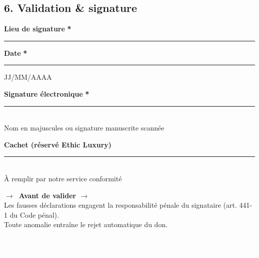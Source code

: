 \documentclass[12pt, a4paper]{article}
\newcommand{\arrow}{\textcolor{ethicGold}{\textbf{$\rightarrow$}}}
\newcommand{\required}{\textcolor{redalert}{\textbf{*}}}
\newcommand{\formfield}[2][]{%
    \par\noindent
    \begin{minipage}[t]{0.3\textwidth}
        \textbf{#2} \required
    \end{minipage}%
    \begin{minipage}[t]{0.68\textwidth}
        \rule{\linewidth}{0.4pt}%
        \ifblank{#1}{}{%
            \vspace{0.1cm}\newline
            {\tiny \textcolor{ethicGreenLight}{#1}}%
        }%
    \end{minipage}%
    \par\vspace{0.2cm}%
}
\begin{document}
\begin{sectionbox}
    \subsection*{6.  Validation \& signature}
    
    \vspace{0.3cm}
    \formfield{Lieu de signature}
    \formfield{Date}{JJ/MM/AAAA}
    
    \vspace{0.3cm}
    \noindent
    \begin{minipage}[t]{0.4\textwidth}
        \textbf{Signature électronique} \required \\
        \rule{\linewidth}{0.4pt} \\
        {\tiny \textcolor{ethicGreenLight}{Nom en majuscules ou signature manuscrite scannée}}
    \end{minipage}%
    \hfill
    \begin{minipage}[t]{0.55\textwidth}
        \textbf{Cachet (réservé Ethic Luxury)} \\
        \rule{\linewidth}{0.4pt} \\
        {\tiny \textcolor{ethicGreenLight}{À remplir par notre service conformité}}
    \end{minipage}
    
    \vspace{0.5cm}
    
    \begin{warningbox}
        \centering
        \textbf{\large \arrow\  Avant de valider  \arrow} \\
        \vspace{0.2cm}
        Les fausses déclarations engagent la responsabilité pénale du signataire (art. 441-1 du Code pénal). \\
        Toute anomalie entraîne le rejet automatique du don.
    \end{warningbox}
\end{sectionbox}

\vspace{0.5cm}

\begin{center}
    \begin{tcolorbox}[colback=ethicGold, colframe=ethicGoldDark, arc=8mm, boxrule=1.5pt, width=0.7\textwidth, enhanced, boxsep=10pt]
        \centering
        {\Large \textbf{\textcolor{white}{\arrow\  VALIDER MON IDENTIFICATION \& EFFECTUER MON DON  \arrow}}}
    \end{tcolorbox}
\end{center}
\end{document}
